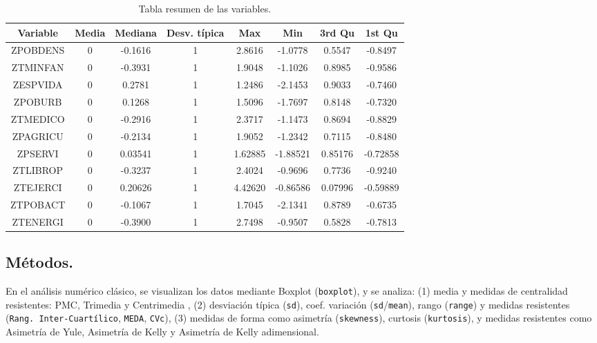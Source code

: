 \documentclass[11pt,a4paper]{article}
\begin{document}
	\begin{table}[H]
	\begin{center}
	\begin{tabular}{|c|c|c|c|c|c|c|c|}
	\hline
	  Variable & Media & Mediana & Desv. típica & Max & Min & 3rd Qu & 1st Qu \\
	\hline \hline
	ZPOBDENS & 0 & -0.1616 & 1	& 2.8616 & -1.0778	& 0.5547	&-0.8497 \\ \hline
	ZTMINFAN & 0 & -0.3931 & 1	& 1.9048 & -1.1026	&0.8985		&-0.9586 \\ \hline
	ZESPVIDA & 0 & 0.2781 & 1	& 1.2486 & -2.1453	&0.9033		&-0.7460 \\ \hline
	ZPOBURB & 0 & 0.1268 & 1	& 1.5096 & -1.7697	&0.8148		&-0.7320 \\ \hline
	ZTMEDICO & 0 & -0.2916 & 1	& 2.3717 & -1.1473	&0.8694		&-0.8829 \\ \hline
	ZPAGRICU & 0 & -0.2134 & 1	& 1.9052 & -1.2342	&0.7115	&-0.8480 \\ \hline
	ZPSERVI & 0 & 0.03541 & 1	& 1.62885 & -1.88521	&0.85176	&-0.72858 \\ \hline
	ZTLIBROP & 0 & -0.3237 & 1	& 2.4024 & -0.9696	&0.7736	&-0.9240 \\ \hline
	ZTEJERCI & 0 & 0.20626 & 1	& 4.42620 & -0.86586	&0.07996	&-0.59889 \\ \hline
	ZTPOBACT & 0 & -0.1067 & 1	& 1.7045 & -2.1341	&0.8789	&-0.6735 \\ \hline
	ZTENERGI & 0 & -0.3900 & 1	& 2.7498 & -0.9507	&0.5828	&-0.7813 \\ \hline

	\end{tabular}
	\caption{Tabla resumen de las variables.}
	\label{tabla:sencilla}
	\end{center}
	\end{table}
	
	\subsection{Métodos.}
	En el análisis numérico clásico, se visualizan los datos mediante Boxplot (\texttt{boxplot}), y se analiza: (1) media y medidas de centralidad resistentes: PMC, Trimedia y Centrimedia , (2) desviación típica (\texttt{sd}), coef. variación (\texttt{sd}/\texttt{mean}), rango (\texttt{range}) y medidas resistentes (\texttt{Rang. Inter-Cuartílico}, \texttt{MEDA}, \texttt{CVc}), (3) medidas de forma como asimetría (\texttt{skewness}), curtosis (\texttt{kurtosis}), y medidas resistentes como Asimetría de Yule, Asimetría de Kelly y Asimetría de Kelly adimensional.
	
\end{document}
